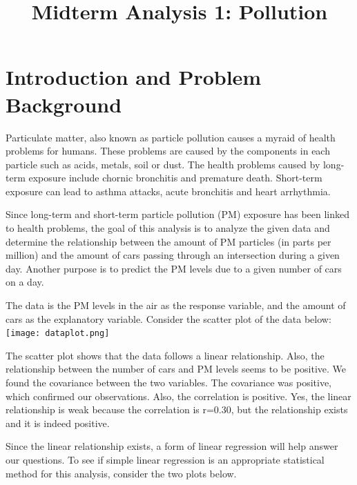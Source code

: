 \documentclass[12pt]{article}\usepackage[]{graphicx}\usepackage[]{color}
\begin{document}
\title{Midterm Analysis 1: Pollution}
\maketitle

\section{Introduction and Problem Background}

Particulate matter, also known as particle pollution causes a myraid of health problems for humans. These problems are caused by the components in each particle such as acids, metals, soil or dust. The health problems caused by long-term exposure include chornic bronchitis and premature death. Short-term exposure can lead to asthma attacks, acute bronchitis and heart arrhythmia. 

Since long-term and short-term particle pollution (PM) exposure has been linked to health problems, the goal of this analysis is to analyze the given data and determine the relationship between the amount of PM particles (in parts per million) and the amount of cars passing through an intersection during a given day. Another purpose is to predict the PM levels due to a given number of cars on a day. 

The data is the PM levels in the air as the response variable, and the amount of cars as the explanatory variable. Consider the scatter plot of the data below:\newline
\texttt{[image: dataplot.png]}


The scatter plot shows that the data follows a linear relationship. Also, the relationship between the number of cars and PM levels seems to be positive. We found the covariance between the two variables. The covariance was positive, which confirmed our observations. Also, the correlation is positive. Yes, the linear relationship is weak because the correlation is r=0.30, but the relationship exists and it is indeed positive.


Since the linear relationship exists, a form of linear regression will help answer our questions. To see if simple linear regression is an appropriate statistical method for this analysis, consider the two plots below. 
\end{document}

